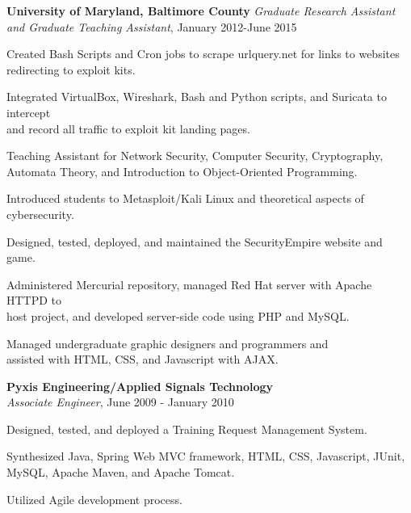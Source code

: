 \atab \textbf{University of Maryland, Baltimore County} \tab \textit{Graduate Research Assistant and Graduate Teaching Assistant}, January 2012-June 2015\\
\begin{my_list}
\item Created Bash Scripts and Cron jobs to scrape urlquery.net for links to websites\\ \tab \tab redirecting to exploit kits.
\item Integrated VirtualBox, Wireshark, Bash and Python scripts, and Suricata to intercept\\ \tab \tab and record all traffic to exploit kit landing pages.
\item Teaching Assistant for Network Security, Computer Security, Cryptography,\\ \tab \tab Automata Theory, and Introduction to Object-Oriented Programming.
\item Introduced students to Metasploit/Kali Linux and theoretical aspects of cybersecurity.
\item Designed, tested, deployed, and maintained the SecurityEmpire website and game.
\item Administered Mercurial repository, managed Red Hat server with Apache HTTPD to\\ \tab \tab host project, and developed server-side code using PHP and MySQL.
\item Managed undergraduate graphic designers and programmers and\\ \tab \tab assisted with HTML, CSS, and Javascript with AJAX.
\end{my_list}


\atab \textbf{Pyxis Engineering/Applied Signals Technology}\\
\btab \textit{Associate Engineer}, June 2009 - January 2010\\
\begin{my_list}
\item Designed, tested, and deployed a Training Request Management System.
\item Synthesized Java, Spring Web MVC framework, HTML, CSS, Javascript, JUnit,\\ \tab \tab MySQL, Apache Maven, and Apache Tomcat.
\item Utilized Agile development process.
\end{my_list}
\medskip

